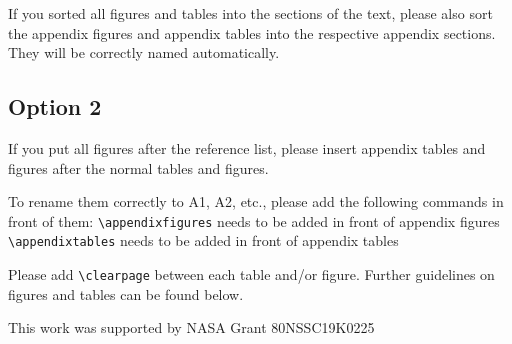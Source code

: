 \documentclass[, manuscript]{copernicus}
\begin{document}
If you sorted all figures and tables into the sections of the text,
please also sort the appendix figures and appendix tables into the
respective appendix sections. They will be correctly named
automatically.

\subsection{Option 2}

If you put all figures after the reference list, please insert appendix
tables and figures after the normal tables and figures.

To rename them correctly to A1, A2, etc., please add the following
commands in front of them: \texttt{\textbackslash{}appendixfigures}
needs to be added in front of appendix figures
\texttt{\textbackslash{}appendixtables} needs to be added in front of
appendix tables

Please add \texttt{\textbackslash{}clearpage} between each table and/or
figure. Further guidelines on figures and tables can be found below.
\noappendix




\begin{acknowledgements}
This work was supported by NASA Grant 80NSSC19K0225
\end{acknowledgements}





\end{document}

